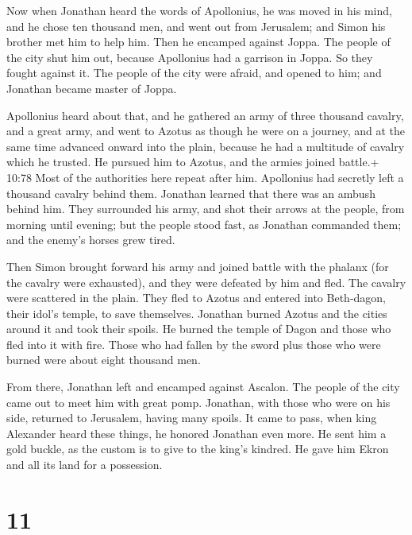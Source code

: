  Now when Jonathan heard the words of Apollonius, he was
moved in his mind, and he chose ten thousand men, and went out from
Jerusalem; and Simon his brother met him to help him.  Then
he encamped against Joppa. The people of the city shut him out, because
Apollonius had a garrison in Joppa.  So they fought against
it. The people of the city were afraid, and opened to him; and Jonathan
became master of Joppa.

 Apollonius heard about that, and he gathered an army of
three thousand cavalry, and a great army, and went to Azotus as though
he were on a journey, and at the same time advanced onward into the
plain, because he had a multitude of cavalry which he trusted.
 He pursued him to Azotus, and the armies joined battle.+
10:78 Most of the authorities here repeat after him. 
Apollonius had secretly left a thousand cavalry behind them.
 Jonathan learned that there was an ambush behind him. They
surrounded his army, and shot their arrows at the people, from morning
until evening;  but the people stood fast, as Jonathan
commanded them; and the enemy's horses grew tired.

 Then Simon brought forward his army and joined battle with
the phalanx (for the cavalry were exhausted), and they were defeated by
him and fled.  The cavalry were scattered in the plain.
They fled to Azotus and entered into Beth-dagon, their idol's temple, to
save themselves.  Jonathan burned Azotus and the cities
around it and took their spoils. He burned the temple of Dagon and those
who fled into it with fire.  Those who had fallen by the
sword plus those who were burned were about eight thousand men.

 From there, Jonathan left and encamped against Ascalon.
The people of the city came out to meet him with great pomp.
 Jonathan, with those who were on his side, returned to
Jerusalem, having many spoils.  It came to pass, when king
Alexander heard these things, he honored Jonathan even more.
 He sent him a gold buckle, as the custom is to give to the
king's kindred. He gave him Ekron and all its land for a possession.

\hypertarget{section-10}{%
\section{11}\label{section-10}}

